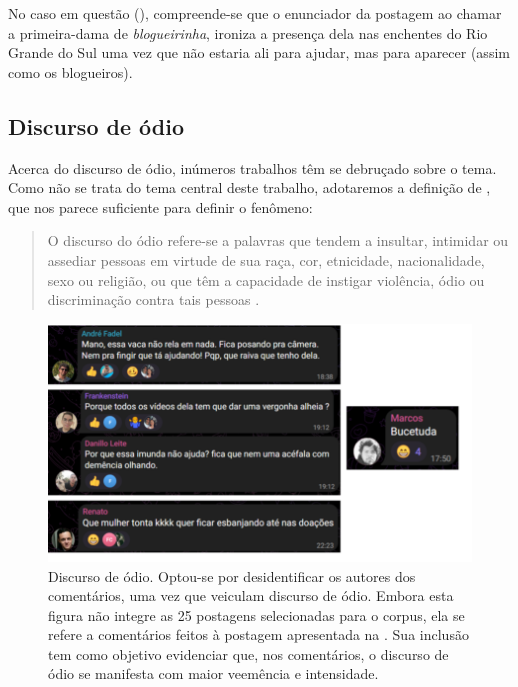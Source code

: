 \documentclass[portuguese]{textolivre}
\begin{document}
No caso em questão (), compreende-se que o enunciador da postagem ao chamar a primeira-dama de \emph{blogueirinha}, ironiza a presença dela nas enchentes do Rio Grande do Sul uma vez que não estaria ali para ajudar, mas para aparecer (assim como os blogueiros). 

\subsection{Discurso de ódio}
Acerca do discurso de ódio, inúmeros trabalhos têm se debruçado sobre o tema. Como não se trata do tema central deste trabalho, adotaremos a definição de \textcite{brugger2007}, que nos parece suficiente para definir o fenômeno: 

\begin{quote}
    O discurso do ódio refere-se a palavras que tendem a insultar, intimidar ou assediar pessoas em virtude de sua raça, cor, etnicidade, nacionalidade, sexo ou religião, ou que têm a capacidade de instigar violência, ódio ou discriminação contra tais pessoas \cite[p.118]{brugger2007}.
\end{quote}

\begin{figure}[ht]
    \centering
    \begin{minipage}{0.75\textwidth}
        \centering
        \includegraphics[width=\textwidth]{Imagens/Fig41.png}
        \caption{Discurso de ódio. Optou-se por desidentificar os autores dos comentários, uma vez que veiculam discurso de ódio. Embora esta figura não integre as 25 postagens selecionadas para o corpus, ela se refere a comentários feitos à postagem apresentada na . Sua inclusão tem como objetivo evidenciar que, nos comentários, o discurso de ódio se manifesta com maior veemência e intensidade.}
        \label{fig-41}
    \end{minipage}
    \end{figure}
    
\end{document}
